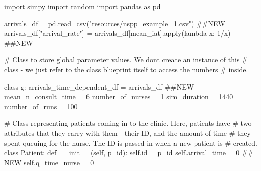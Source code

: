 \documentclass[
  letterpaper,
  DIV=11,
  numbers=noendperiod]{scrreprt}
\newenvironment{Shaded}{\begin{snugshade}}{\end{snugshade}}
\newcommand{\BuiltInTok}[1]{\textcolor[rgb]{0.00,0.23,0.31}{#1}}
\newcommand{\CommentTok}[1]{\textcolor[rgb]{0.37,0.37,0.37}{#1}}
\newcommand{\DecValTok}[1]{\textcolor[rgb]{0.68,0.00,0.00}{#1}}
\newcommand{\FunctionTok}[1]{\textcolor[rgb]{0.28,0.35,0.67}{#1}}
\newcommand{\ImportTok}[1]{\textcolor[rgb]{0.00,0.46,0.62}{#1}}
\newcommand{\KeywordTok}[1]{\textcolor[rgb]{0.00,0.23,0.31}{#1}}
\newcommand{\NormalTok}[1]{\textcolor[rgb]{0.00,0.23,0.31}{#1}}
\newcommand{\OperatorTok}[1]{\textcolor[rgb]{0.37,0.37,0.37}{#1}}
\newcommand{\StringTok}[1]{\textcolor[rgb]{0.13,0.47,0.30}{#1}}
\newcommand{\VariableTok}[1]{\textcolor[rgb]{0.07,0.07,0.07}{#1}}
\begin{document}
\begin{tcolorbox}[enhanced jigsaw, rightrule=.15mm, colback=white, colframe=quarto-callout-note-color-frame, colbacktitle=quarto-callout-note-color!10!white, toprule=.15mm, coltitle=black, opacityback=0, titlerule=0mm, bottomtitle=1mm, breakable, title=\textcolor{quarto-callout-note-color}{\faInfo}\hspace{0.5em}{Note}, opacitybacktitle=0.6, toptitle=1mm, arc=.35mm, bottomrule=.15mm, leftrule=.75mm, left=2mm]

\begin{Shaded}
\begin{Highlighting}[]
\ImportTok{import}\NormalTok{ simpy}
\ImportTok{import}\NormalTok{ random}
\ImportTok{import}\NormalTok{ pandas }\ImportTok{as}\NormalTok{ pd}

\NormalTok{arrivals\_df }\OperatorTok{=}\NormalTok{ pd.read\_csv(}\StringTok{"resources/nspp\_example\_1.csv"}\NormalTok{) }\CommentTok{\#\#NEW}
\NormalTok{arrivals\_df[}\StringTok{"arrival\_rate"}\NormalTok{] }\OperatorTok{=}\NormalTok{ arrivals\_df[}\StringTok{\textquotesingle{}mean\_iat\textquotesingle{}}\NormalTok{].}\BuiltInTok{apply}\NormalTok{(}\KeywordTok{lambda}\NormalTok{ x: }\DecValTok{1}\OperatorTok{/}\NormalTok{x) }\CommentTok{\#\#NEW}

\CommentTok{\# Class to store global parameter values.  We don\textquotesingle{}t create an instance of this}
\CommentTok{\# class {-} we just refer to the class blueprint itself to access the numbers}
\CommentTok{\# inside.}

\KeywordTok{class}\NormalTok{ g:}
\NormalTok{    arrivals\_time\_dependent\_df }\OperatorTok{=}\NormalTok{ arrivals\_df }\CommentTok{\#\#NEW}
\NormalTok{    mean\_n\_consult\_time }\OperatorTok{=} \DecValTok{6}
\NormalTok{    number\_of\_nurses }\OperatorTok{=} \DecValTok{1}
\NormalTok{    sim\_duration }\OperatorTok{=} \DecValTok{1440}
\NormalTok{    number\_of\_runs }\OperatorTok{=} \DecValTok{100}

\CommentTok{\# Class representing patients coming in to the clinic.  Here, patients have}
\CommentTok{\# two attributes that they carry with them {-} their ID, and the amount of time}
\CommentTok{\# they spent queuing for the nurse.  The ID is passed in when a new patient is}
\CommentTok{\# created.}
\KeywordTok{class}\NormalTok{ Patient:}
    \KeywordTok{def} \FunctionTok{\_\_init\_\_}\NormalTok{(}\VariableTok{self}\NormalTok{, p\_id):}
        \VariableTok{self}\NormalTok{.}\BuiltInTok{id} \OperatorTok{=}\NormalTok{ p\_id}
        \VariableTok{self}\NormalTok{.arrival\_time }\OperatorTok{=} \DecValTok{0} \CommentTok{\#\# NEW}
        \VariableTok{self}\NormalTok{.q\_time\_nurse }\OperatorTok{=} \DecValTok{0}


\end{Highlighting}
\end{Shaded}
\end{tcolorbox}
\end{document}
